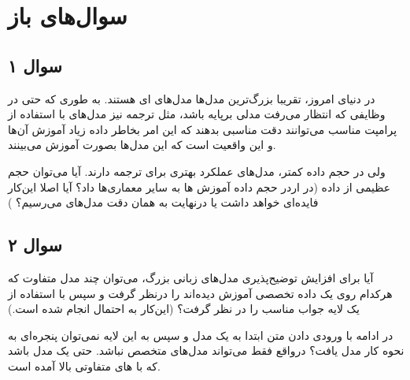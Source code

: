 \documentclass[12pt]{article}
\begin{document}
	\section{سوال‌های باز}
	\subsection*{سوال ۱}
در دنیای امروز، تقریبا بزرگ‌ترین مدل‌ها مدل‌های  ای هستند. به طوری که حتی در وظایفی که انتظار می‌رفت مدلی برپایه 
باشد،‌ مثل ترجمه نیز مدل‌های 
با استفاده از پرامپت مناسب می‌توانند دقت مناسبی بدهند که این امر بخاطر داده زیاد آموزش آن‌ها و این واقعیت است که این مدل‌ها بصورت 
آموزش می‌بینند.

ولی در حجم داده کمتر، مدل‌های 
عملکرد بهتری برای ترجمه دارند. آیا می‌توان حجم عظیمی از داده (در اردر حجم داده آموزش 
 ها
به سایر معماری‌ها داد؟ آیا اصلا این‌کار فایده‌ای خواهد داشت یا درنهایت به  همان دقت مدل‌های
می‌رسیم؟
)

\subsection*{سوال ۲}
آیا برای افزایش توضیح‌پذیری مدل‌های زبانی بزرگ،‌ می‌توان چند مدل متفاوت که هرکدام روی یک داده تخصصی آموزش دیده‌اند را درنظر گرفت و سپس با استفاده از یک لایه
جواب مناسب را در نظر گرفت؟ (این‌کار به احتمال انجام شده است.) 

در ادامه با ورودی دادن متن ابتدا به یک مدل 
و سپس به این لایه 
نمی‌توان پنجره‌ای به نحوه کار مدل یافت؟ درواقع فقط می‌تواند مدل‌های متخصص نباشد. حتی یک مدل باشد که با 
های متفاوتی بالا آمده است.
\end{document}
